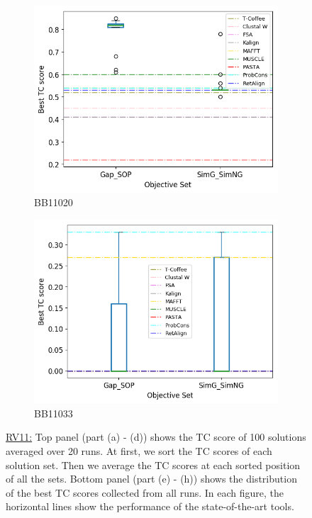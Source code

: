 \begin{figure}[!htbp]
\begin{adjustwidth}{-1cm}{-1cm}
\begin{subfigure}{0.22\textwidth}
			\includegraphics[width=\columnwidth]{Figure/summary/precomputedInit/Balibase/BB11020_objset_tc_rank_2}
			\caption{BB11020}
		\end{subfigure}
		\begin{subfigure}{0.22\textwidth}
			\includegraphics[width=\columnwidth]{Figure/summary/precomputedInit/Balibase/BB11033_objset_tc_rank_2}
			\caption{BB11033}
		\end{subfigure}
		\caption{\underline{RV11:} Top panel (part (a) - (d)) shows the TC score of 100 solutions averaged over 20 runs. At first, we sort the TC scores of each solution set. Then we average the TC scores at each sorted position of all the sets. Bottom panel (part (e) - (h)) shows the distribution of the best TC scores collected from all runs. In each figure, the horizontal lines show the performance of the state-of-the-art tools.}
		\label{fig:rv11_tc}
	\end{adjustwidth}
\end{figure}


